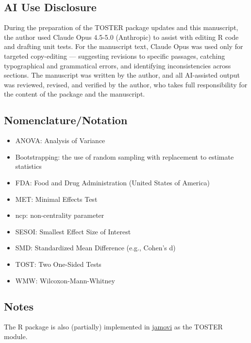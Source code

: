 \documentclass[]{interact}
\theoremstyle{plain}%
\theoremstyle{definition}
\theoremstyle{remark}
\providecommand{\tightlist}{%
  \setlength{\itemsep}{0pt}\setlength{\parskip}{0pt}}
\def\tightlist{}
\begin{document}
\subsection*{AI Use Disclosure}\label{ai-use-disclosure}

During the preparation of the TOSTER package updates and this
manuscript, the author used Claude Opus 4.5-5.0 (Anthropic) to assist
with editing R code and drafting unit tests. For the manuscript text,
Claude Opus was used only for targeted copy-editing --- suggesting
revisions to specific passages, catching typographical and grammatical
errors, and identifying inconsistencies across sections. The manuscript
was written by the author, and all AI-assisted output was reviewed,
revised, and verified by the author, who takes full responsibility for
the content of the package and the manuscript.

\subsection*{Nomenclature/Notation}\label{nomenclaturenotation}

\begin{itemize}
\tightlist
\item
  ANOVA: Analysis of Variance
\item
  Bootstrapping: the use of random sampling with replacement to estimate
  statistics
\item
  FDA: Food and Drug Administration (United States of America)
\item
  MET: Minimal Effects Test
\item
  ncp: non-centrality parameter
\item
  SESOI: Smallest Effect Size of Interest
\item
  SMD: Standardized Mean Difference (e.g., Cohen's d)
\item
  TOST: Two One-Sided Tests
\item
  WMW: Wilcoxon-Mann-Whitney
\end{itemize}

\subsection*{Notes}\label{notes}

The R package is also (partially) implemented in
\href{https://www.jamovi.org/}{jamovi} as the TOSTER module.
\end{document}
